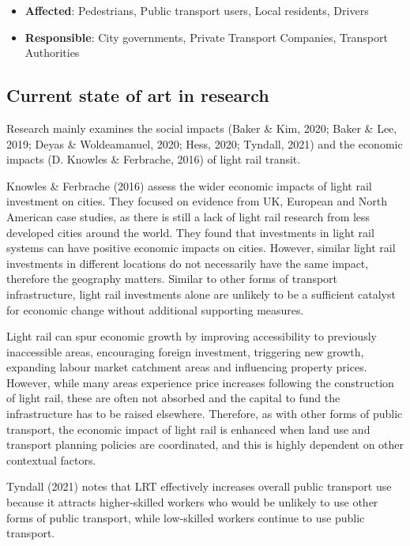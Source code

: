 \documentclass[
]{book}
\providecommand{\tightlist}{%
  \setlength{\itemsep}{0pt}\setlength{\parskip}{0pt}}
\begin{document}
\begin{itemize}
\tightlist
\item
  \textbf{Affected}: Pedestrians, Public transport users, Local residents, Drivers
\item
  \textbf{Responsible}: City governments, Private Transport Companies, Transport Authorities
\end{itemize}

\hypertarget{current-state-of-art-in-research-38}{%
\subsection*{Current state of art in research}\label{current-state-of-art-in-research-38}}

Research mainly examines the social impacts (Baker \& Kim, 2020; Baker \& Lee, 2019; Deyas \& Woldeamanuel, 2020; Hess, 2020; Tyndall, 2021) and the economic impacts (D. Knowles \& Ferbrache, 2016) of light rail transit.

Knowles \& Ferbrache (2016) assess the wider economic impacts of light rail investment on cities. They focused on evidence from UK, European and North American case studies, as there is still a lack of light rail research from less developed cities around the world. They found that investments in light rail systems can have positive economic impacts on cities. However, similar light rail investments in different locations do not necessarily have the same impact, therefore the geography matters. Similar to other forms of transport infrastructure, light rail investments alone are unlikely to be a sufficient catalyst for economic change without additional supporting measures.

Light rail can spur economic growth by improving accessibility to previously inaccessible areas, encouraging foreign investment, triggering new growth, expanding labour market catchment areas and influencing property prices. However, while many areas experience price increases following the construction of light rail, these are often not absorbed and the capital to fund the infrastructure has to be raised elsewhere. Therefore, as with other forms of public transport, the economic impact of light rail is enhanced when land use and transport planning policies are coordinated, and this is highly dependent on other contextual factors.

Tyndall (2021) notes that LRT effectively increases overall public transport use because it attracts higher-skilled workers who would be unlikely to use other forms of public transport, while low-skilled workers continue to use public transport.
\end{document}
